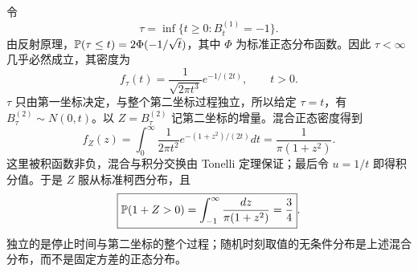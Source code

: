 令
\[
 \tau=\inf\{t\ge0:B_t^{(1)}=-1\}.
\]
由反射原理，$\mathbb{P}(\tau\le t)=2\Phi(-1/\sqrt t)$，其中 $\Phi$ 为标准正态分布函数。因此 $\tau<\infty$ 几乎必然成立，其密度为
\[
 f_\tau(t)=\frac1{\sqrt{2\pi t^3}}e^{-1/(2t)},\qquad t>0.
\]
$\tau$ 只由第一坐标决定，与整个第二坐标过程独立，所以给定 $\tau=t$，有 $B_\tau^{(2)}\sim N(0,t)$。以 $Z=B_\tau^{(2)}$ 记第二坐标的增量。混合正态密度得到
\[
 f_Z(z)=\int_0^\infty\frac1{2\pi t^2}
            e^{-(1+z^2)/(2t)}dt
       =\frac1{\pi(1+z^2)}.
\]
这里被积函数非负，混合与积分交换由 Tonelli 定理保证；最后令 $u=1/t$ 即得积分值。于是 $Z$ 服从标准柯西分布，且
\[
 \boxed{\mathbb{P}(1+Z>0)
   =\int_{-1}^\infty\frac{dz}{\pi(1+z^2)}
   =\frac34}.
\]
独立的是停止时间与第二坐标的整个过程；随机时刻取值的无条件分布是上述混合分布，而不是固定方差的正态分布。
